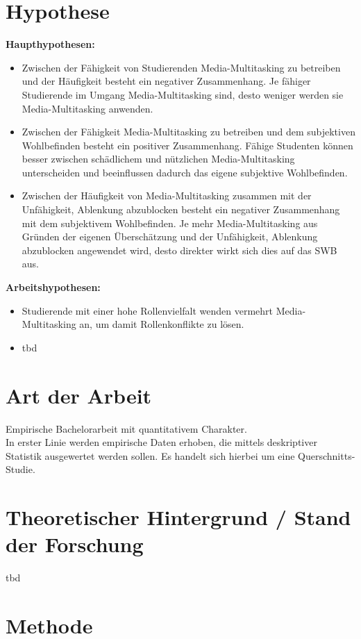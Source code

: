 \section*{Hypothese}\label{section.hypothesen}
\textbf{Haupthypothesen:}
\begin{itemize}
    \item Zwischen der Fähigkeit von Studierenden Media-Multitasking zu betreiben und der Häufigkeit besteht ein negativer Zusammenhang. Je fähiger Studierende im Umgang Media-Multitasking sind, desto weniger werden sie Media-Multitasking anwenden.
    \item Zwischen der Fähigkeit Media-Multitasking zu betreiben und dem subjektiven Wohlbefinden besteht ein positiver Zusammenhang. Fähige Studenten können besser zwischen schädlichem und nützlichen Media-Multitasking unterscheiden und beeinflussen dadurch das eigene subjektive Wohlbefinden.
    \item Zwischen der Häufigkeit von Media-Multitasking zusammen mit der Unfähigkeit, Ablenkung abzublocken besteht ein negativer Zusammenhang mit dem subjektivem Wohlbefinden. Je mehr Media-Multitasking aus Gründen der eigenen Überschätzung und der Unfähigkeit, Ablenkung abzublocken angewendet wird, desto direkter wirkt sich dies auf das SWB aus.
\end{itemize}
\textbf{Arbeitshypothesen:}
\begin{itemize}
    \item Studierende mit einer hohe Rollenvielfalt wenden vermehrt Media-Multitasking an, um damit Rollenkonflikte zu lösen.
    \item tbd
\end{itemize}
\section*{Art der Arbeit}\label{section.artArbeit}
Empirische Bachelorarbeit mit quantitativem Charakter. \\
In erster Linie werden empirische Daten erhoben, die mittels deskriptiver Statistik ausgewertet werden sollen. Es handelt sich hierbei um eine Querschnitts-Studie. 
\section*{Theoretischer Hintergrund / Stand der Forschung}\label{section.forschung}
tbd
\section*{Methode}\label{section.methode}
